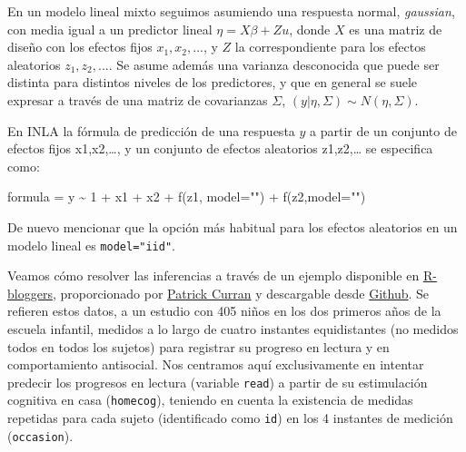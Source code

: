 \documentclass[
]{book}
\newenvironment{Shaded}{\begin{snugshade}}{\end{snugshade}}
\newcommand{\AttributeTok}[1]{\textcolor[rgb]{0.77,0.63,0.00}{#1}}
\newcommand{\DecValTok}[1]{\textcolor[rgb]{0.00,0.00,0.81}{#1}}
\newcommand{\FunctionTok}[1]{\textcolor[rgb]{0.00,0.00,0.00}{#1}}
\newcommand{\NormalTok}[1]{#1}
\newcommand{\OtherTok}[1]{\textcolor[rgb]{0.56,0.35,0.01}{#1}}
\newcommand{\SpecialCharTok}[1]{\textcolor[rgb]{0.00,0.00,0.00}{#1}}
\newcommand{\StringTok}[1]{\textcolor[rgb]{0.31,0.60,0.02}{#1}}
\begin{document}
En un modelo lineal mixto seguimos asumiendo una respuesta normal, \emph{gaussian}, con media igual a un predictor lineal \(\eta=X\beta + Z u\), donde \(X\) es una matriz de diseño con los efectos fijos \(x_1,x_2,...\), y \(Z\) la correspondiente para los efectos aleatorios \(z_1, z_2,...\). Se asume además una varianza desconocida que puede ser distinta para distintos niveles de los predictores, y que en general se suele expresar a través de una matriz de covarianzas \(\Sigma\), \((y|\eta,\Sigma) \sim N(\eta,\Sigma)\).

En INLA la fórmula de predicción de una respuesta \(y\) a partir de un conjunto de efectos fijos x1,x2,\ldots, y un conjunto de efectos aleatorios z1,z2,\ldots{} se especifica como:

\begin{Shaded}
\begin{Highlighting}[]
\NormalTok{formula }\OtherTok{=}\NormalTok{ y }\SpecialCharTok{\textasciitilde{}} \DecValTok{1} \SpecialCharTok{+}\NormalTok{ x1 }\SpecialCharTok{+}\NormalTok{ x2  }\SpecialCharTok{+} \FunctionTok{f}\NormalTok{(z1, }\AttributeTok{model=}\StringTok{""}\NormalTok{) }\SpecialCharTok{+} \FunctionTok{f}\NormalTok{(z2,}\AttributeTok{model=}\StringTok{""}\NormalTok{) }
\end{Highlighting}
\end{Shaded}

De nuevo mencionar que la opción más habitual para los efectos aleatorios en un modelo lineal es \texttt{model="iid"}.

Veamos cómo resolver las inferencias a través de un ejemplo disponible en \href{https://www.r-bloggers.com/2019/09/bayesian-linear-mixed-models-random-intercepts-slopes-and-missing-data/}{R-bloggers}, proporcionado por \href{https://curran.web.unc.edu/}{Patrick Curran} y descargable desde \href{https://github.com/MultiLevelAnalysis/Datasets-third-edition-Multilevel-book/blob/master/chapter\%205/Curran/CurranLong.sav}{Github}. Se refieren estos datos, a un estudio con 405 niños en los dos primeros años de la escuela infantil, medidos a lo largo de cuatro instantes equidistantes (no medidos todos en todos los sujetos) para registrar su progreso en lectura y en comportamiento antisocial. Nos centramos aquí exclusivamente en intentar predecir los progresos en lectura (variable \texttt{read}) a partir de su estimulación cognitiva en casa (\texttt{homecog}), teniendo en cuenta la existencia de medidas repetidas para cada sujeto (identificado como \texttt{id}) en los 4 instantes de medición (\texttt{occasion}).
\end{document}

